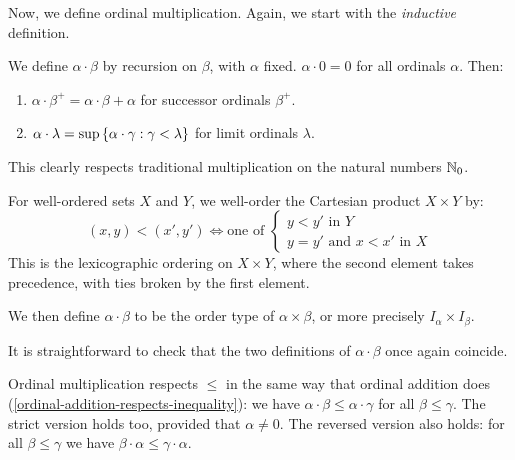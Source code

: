 \documentclass{article}
\begin{document}
Now, we define ordinal multiplication. Again, we start with the \textit{inductive} definition.

\begin{definition}
    We define $\alpha \cdot \beta$ by recursion on $\beta$, with $\alpha$ fixed. $\alpha \cdot 0 = 0$ for all ordinals $\alpha$. Then:
    \begin{enumerate}
    	\item $\alpha \cdot \beta^+ = \alpha \cdot \beta + \alpha$ for successor ordinals $\beta^+$.
    	\item $\alpha \cdot \lambda = \sup \left\lbrace \alpha \cdot \gamma : \gamma < \lambda \right\rbrace$ for limit ordinals $\lambda$.
	\end{enumerate}
	This clearly respects traditional multiplication on the natural numbers $\mathbb{N}_0$.
\end{definition}

\begin{definition}
    For well-ordered sets $X$ and $Y$, we well-order the Cartesian product $X \times Y$ by:
    \[
	(x, y) < (x', y') \iff \text{one of } \begin{cases}
		y < y' \text{ in } Y \\
		y = y' \text{ and } x < x' \text{ in } X
	\end{cases}
	\]
	This is the lexicographic ordering on $X \times Y$, where the second element takes precedence, with ties broken by the first element.
	
	We then define $\alpha \cdot \beta$ to be the order type of $\alpha \times \beta$, or more precisely $I_\alpha \times I_\beta$.
\end{definition}

\begin{corollary}
	It is straightforward to check that the two definitions of $\alpha \cdot \beta$ once again coincide.
\end{corollary}

\begin{corollary}
	Ordinal multiplication respects $\leq$ in the same way that ordinal addition does (\ref{ordinal-addition-respects-inequality}): we have $\alpha \cdot \beta \leq \alpha \cdot \gamma$ for all $\beta \leq \gamma$. The strict version holds too, provided that $\alpha \neq 0$. The reversed version also holds: for all $\beta \leq \gamma$ we have $\beta \cdot \alpha \leq \gamma \cdot \alpha$.
\end{corollary}
\end{document}

